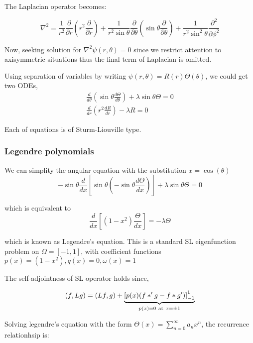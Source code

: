 \documentclass{article}
\theoremstyle{definition}
\begin{document}
The Laplacian operator becomes:

\begin{equation}
\nabla ^2=\frac{1}{r^2}\frac{\partial}{\partial r}\left(r^2\frac{\partial}{\partial r}\right)+\frac{1}{r^2\sin\theta}\frac{\partial}{\partial \theta}\left(\sin \theta \frac{\partial}{\partial \theta}\right)+\frac{1}{r^2\sin^2\theta}\frac{\partial^2}{\partial \phi^2}
\end{equation}


Now, seeking solution for $\nabla^2\psi(r,\theta)=0$ since we restrict attention to axisymmetric situations thus the final term of Laplacian is omitted.

Using separation of variables by writing $\psi(r,\theta)=R(r)\Theta(\theta)$, we could get two ODEs,
\begin{align}
\frac{d}{d\theta}\left(\sin \theta \frac{d\Theta}{d\theta}\right)+\lambda \sin \theta \Theta=0\\
\frac{d}{dr}\left(r^2\frac{dR}{dr}\right)-\lambda R=0
\end{align}

Each of equations is of Sturm-Liouville type.

\subsubsection{Legendre polynomials}

We can simplity the angular equation with the substitution $x=\cos(\theta)$
\begin{equation}
-\sin\theta \frac{d}{dx}\left[\sin \theta \left(-\sin \theta \frac{d\Theta}{dx}\right)\right]+\lambda \sin \theta \Theta =0
\end{equation}

which is equivalent to
\begin{equation}
\frac{d}{dx}\left[(1-x^2)\frac{\Theta}{dx}\right]=-\lambda \Theta
\end{equation}

which is known as Legendre's equation. This is a standard SL eigenfunction problem on $\Omega =[-1,1]$, with coefficient functions $p(x)=(1-x^2), q(x)=0, \omega(x)=1$

The self-adjointness of SL operator holds since,

\begin{equation}
(f,Lg)=(Lf,g)+\underbrace{\left[p(x)(f*'g-f*g')\right]_{-1}^1}_{p(x)=0 \ \textup{at} \ x=\pm 1}
\end{equation}

Solving legendre's equation with the form $\Theta(x)=\sum_{n=0}^{\infty}a_n x^n$, the recurrence relationhsip is:
\end{document}
